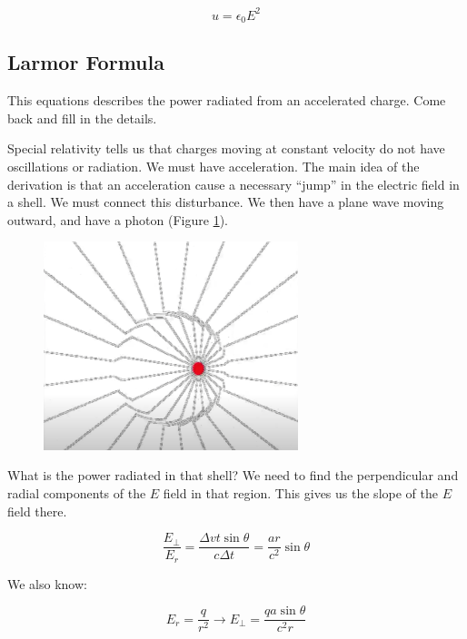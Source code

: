 \documentclass{article}
\begin{document}
\begin{equation}
    \boxed{u = \epsilon_0 E^2}
\end{equation}


\subsection{Larmor Formula}

This equations describes the power radiated from an accelerated charge. Come back and fill in the details. 

Special relativity tells us that charges moving at constant velocity do not have oscillations or radiation. We must have acceleration. The main idea of the derivation is that an acceleration cause a necessary ``jump'' in the electric field in a shell. We must connect this disturbance. We then have a plane wave moving outward, and have a photon (Figure \ref{fig:no}).

\begin{figure}
    \centering
    \includegraphics[width=0.66\textwidth]{figures/Screen Shot 2020-09-02 at 10.45.56 PM.png}
    \caption{}
    \label{fig:no}
\end{figure}

What is the power radiated in that shell? We need to find the perpendicular and radial components of the $E$ field in that region. This gives us the slope of the $E$ field there. 

\begin{equation}
    \frac{E_\perp}{E_r} = \frac{\Delta v t \sin{\theta}}{c \Delta t} = \frac{ar}{c^2} \sin{\theta}
\end{equation}

We also know:

\begin{equation}
    E_r = \frac{q}{r^2} \rightarrow E_\perp = \frac{qa \sin{\theta}}{c^2 r}
\end{equation}
\end{document}
